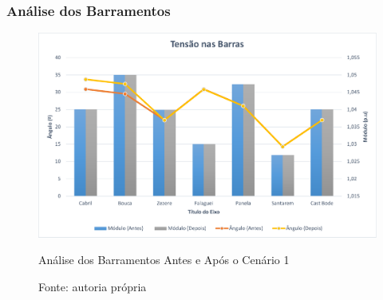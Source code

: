     
\subsubsection{Análise dos Barramentos}

\begin{figure}[H]
	\centering
	\captionsetup{width=\textwidth, font=footnotesize, textfont=bf}	
	\includegraphics[width=\linewidth]{img/tensoes_barras_caso1.pdf}
	\caption{Análise dos Barramentos Antes e Após o Cenário 1}
	\vspace{-3.5mm}
	\caption*{Fonte: autoria própria}
	\label{fig:tensoes_barras_caso1}
\end{figure}
